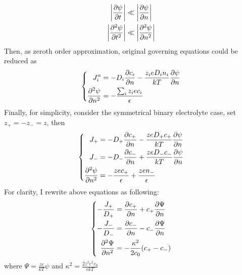 \documentclass[fontsize=11pt, %
                             paper=a4, %
                             twoside, %
                             captions=tableheading,
                             index=totoc,
                             hyperref]{labbook}
\begin{document}
\begin{addmargin}[4cm]{0cm}
\begin{equation}
\begin{aligned}
\left| \frac{\partial \psi}{\partial t} \right|&\ll\left| \frac{\partial \psi}{\partial n} \right|\\
\left| \frac{\partial^2 \psi}{\partial t^2} \right|&\ll\left| \frac{\partial^2 \psi}{\partial n^2} \right|
\end{aligned}
\end{equation}
Then, as zeroth order approximation, original governing equations could be reduced as
\begin{equation}
\left\{
\begin{aligned}
J_i^n &= -D_i \frac{\partial c_i}{\partial n}-\frac{z_i e D_i n_i}{kT}\frac{\partial \psi}{\partial n}\\
\frac{\partial^2 \psi}{\partial n^2}&=-\frac{\sum_i z_i e c_i}{\epsilon}
\end{aligned}
\right.
\end{equation}
Finally, for simplicity, consider the symmetrical binary electrolyte case, set $z_+=-z_-=z$, then
\begin{equation}
\left\{
\begin{aligned}
J_+ &=-D_+ \frac{\partial c_+}{\partial n}-\frac{zeD_+c_+}{kT}\frac{\partial \psi}{\partial n}\\
J_-&=-D_-\frac{\partial c_-}{\partial n}+\frac{zeD_-c_-}{kT}\frac{\partial \psi}{\partial n}\\
\frac{\partial^2 \psi}{\partial n^2}&=-\frac{zec_+}{\epsilon}+\frac{zen_-}{\epsilon}
\end{aligned}
\right.
\end{equation}
For clarity, I rewrite above equations as following:
\begin{equation}
\left\{
\begin{aligned}
-\frac{J_+}{D_+}&=\frac{\partial c_+}{\partial n}+c_+\frac{\partial \Psi}{\partial n}\\
-\frac{J_-}{D_-}&=\frac{\partial c_-}{\partial n}-c_-\frac{\partial \Psi}{\partial n}\\
\frac{\partial^2 \Psi}{\partial n^2}&=-\frac{\kappa^2}{2c_0}(c_+-c_-)
\end{aligned}
\right.
\end{equation}
where $\Psi=\frac{ze}{kT}\psi$ and $\kappa^2=\frac{2z^2e^2 c_0}{\epsilon kT}$

\end{addmargin}
\end{document}
